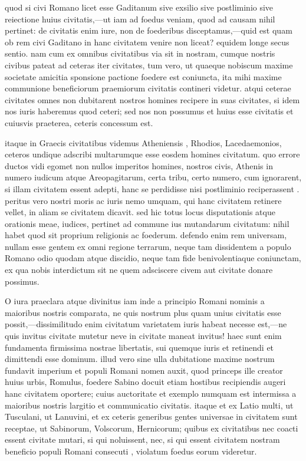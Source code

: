  quod si civi Romano licet esse Gaditanum sive exsilio sive postliminio sive reiectione huius civitatis,—ut iam ad foedus veniam, quod ad causam nihil pertinet: de civitatis enim iure, non de foederibus disceptamus,—quid est quam ob rem civi Gaditano in hanc civitatem venire non liceat? equidem longe secus sentio. nam cum ex omnibus civitatibus via sit in nostram, cumque nostris civibus pateat ad ceteras iter civitates, tum vero, ut quaeque nobiscum maxime societate amicitia sponsione pactione foedere est coniuncta, ita mihi maxime communione beneficiorum praemiorum civitatis contineri videtur. atqui ceterae civitates omnes non dubitarent nostros homines recipere in suas civitates, si idem nos iuris haberemus quod ceteri; sed nos non possumus et huius esse civitatis et cuiusvis praeterea, ceteris concessum est.

 itaque in Graecis civitatibus videmus Atheniensis , Rhodios, Lacedaemonios, ceteros undique adscribi multarumque esse eosdem homines civitatum. quo errore ductos vidi egomet non nullos imperitos homines, nostros civis, Athenis in numero iudicum atque Areopagitarum, certa tribu, certo numero, cum ignorarent, si illam civitatem essent adepti, hanc se perdidisse nisi postliminio reciperassent . peritus vero nostri moris ac iuris nemo umquam, qui hanc civitatem retinere vellet, in aliam se civitatem dicavit. sed hic totus locus disputationis atque orationis meae, iudices, pertinet ad commune ius mutandarum civitatum: nihil habet quod sit proprium religionis ac foederum. defendo enim rem universam, nullam esse gentem ex omni regione terrarum, neque tam dissidentem a populo Romano odio quodam atque discidio, neque tam fide benivolentiaque coniunctam, ex qua nobis interdictum sit ne quem adsciscere civem aut civitate donare possimus.

 O iura praeclara atque divinitus iam inde a principio Romani nominis a maioribus nostris comparata, ne quis nostrum plus quam unius civitatis esse possit,—dissimilitudo enim civitatum varietatem iuris habeat necesse est,—ne quis invitus civitate mutetur neve in civitate maneat invitus! haec sunt enim fundamenta firmissima nostrae libertatis, sui quemque iuris et retinendi et dimittendi esse dominum. illud vero sine ulla dubitatione maxime nostrum fundavit imperium et populi Romani nomen auxit, quod princeps ille creator huius urbis, Romulus, foedere Sabino docuit etiam hostibus recipiendis augeri hanc civitatem oportere; cuius auctoritate et exemplo numquam est intermissa a maioribus nostris largitio et communicatio civitatis. itaque et ex Latio multi, ut Tusculani, ut Lanuvini, et ex ceteris generibus gentes universae in civitatem sunt receptae, ut Sabinorum, Volscorum, Hernicorum; quibus ex civitatibus nec coacti essent civitate mutari, si qui noluissent, nec, si qui essent civitatem nostram beneficio populi Romani consecuti , violatum foedus eorum videretur.


